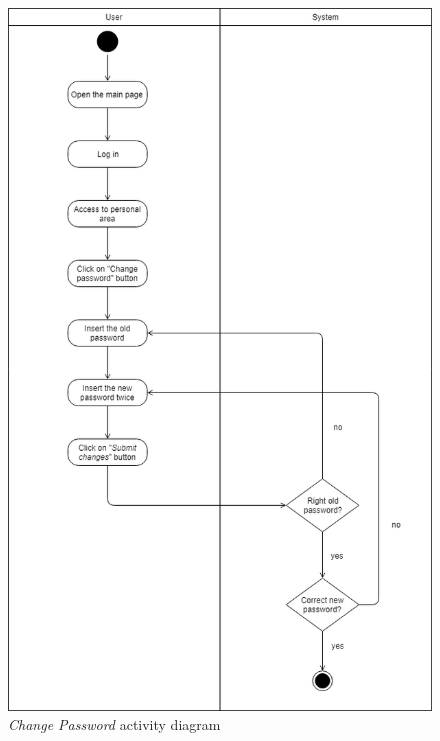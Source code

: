 \begin{figure}[H]
\begin{center}
  \includegraphics[height=0.6\paperheight]{img/activity/ChangePassword.png}
  \hspace{0.05\linewidth}
  \centering
  \caption{\textit{Change Password} activity diagram}
  \label{img:changePasswordActivityDiagram}
\end{center}
\end{figure}

